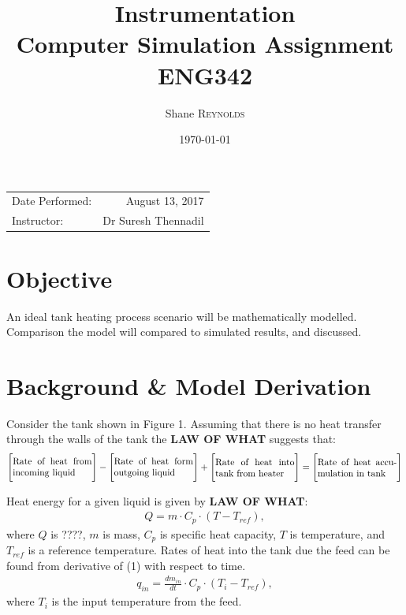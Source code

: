 \documentclass{article}
\title{Instrumentation \\ Computer Simulation Assignment \\ ENG342} %
\author{Shane \textsc{Reynolds}} %
\date{\today} %
\begin{document}
\maketitle %

\begin{center}
\begin{tabular}{l r}
Date Performed: & August 13, 2017 \\ %
Instructor: & Dr Suresh Thennadil %
\end{tabular}
\end{center}



\section{Objective}

An ideal tank heating process scenario will be mathematically modelled. Comparison the model will compared to simulated results, and discussed.


\section{Background \& Model Derivation}
Consider the tank shown in Figure 1. Assuming that there is no heat transfer through the walls of the tank the \textbf{LAW OF WHAT} suggests that:
\begin{align}
\Bigg[\parbox{3cm}{Rate of heat from incoming liquid}\Bigg] - \Bigg[\parbox{3cm}{Rate of heat form outgoing liquid}\Bigg] + \Bigg[\parbox{3cm}{Rate of heat into tank from heater}\Bigg] = \Bigg[\parbox{3cm}{Rate of heat accumulation in tank}\Bigg]
\end{align}

Heat energy for a given liquid is given by \textbf{LAW OF WHAT}:
\begin{align}
Q = m \cdot C_p \cdot (T - T_{ref}),
\end{align}
where $Q$ is ????, $m$ is mass, $C_p$ is specific heat capacity, $T$ is temperature, and $T_{ref}$ is a reference temperature. Rates of heat into the tank due the feed can be found from derivative of (1) with respect to time.
\begin{align}
q_{in} = \frac{dm_{in}}{dt} \cdot C_p \cdot (T_i - T_{ref}),
\end{align}
where $T_i$ is the input temperature from the feed.
\end{document}
